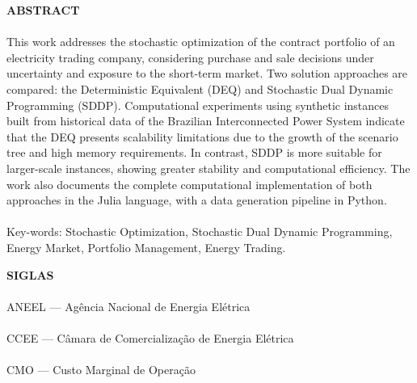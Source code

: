 \pagebreak

\begin{center}
\textbf{ABSTRACT}
\end{center}
      \vspace{0.5cm}

\paragraph{}This work addresses the stochastic optimization of the contract portfolio of an electricity trading company, considering purchase and sale decisions under uncertainty and exposure to the short-term market. Two solution approaches are compared: the Deterministic Equivalent (DEQ) and Stochastic Dual Dynamic Programming (SDDP). Computational experiments using synthetic instances built from historical data of the Brazilian Interconnected Power System indicate that the DEQ presents scalability limitations due to the growth of the scenario tree and high memory requirements. In contrast, SDDP is more suitable for larger-scale instances, showing greater stability and computational efficiency. The work also documents the complete computational implementation of both approaches in the Julia language, with a data generation pipeline in Python.

\paragraph{}
\noindent Key-words: Stochastic Optimization, Stochastic Dual Dynamic Programming, Energy Market, Portfolio Management, Energy Trading.

\pagebreak

\begin{center}
\textbf{SIGLAS}
\end{center}
      \vspace{0.5cm}

\paragraph{}ANEEL --- Ag\^encia Nacional de Energia El\'etrica
\paragraph{}CCEE --- C\^amara de Comercializa\c{c}\~ao de Energia El\'etrica
\paragraph{}CMO --- Custo Marginal de Opera\c{c}\~ao
